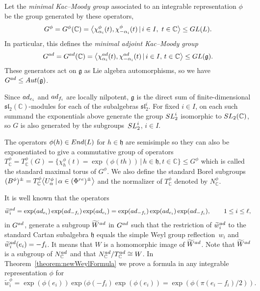 \documentclass[11pt]{article}
\numberwithin{equation}{section}
\numberwithin{equation}{section}
\def\C{{\mathbb C}}
\def\a{\alpha}
\def\wtil{\widetilde w}
\def\Wtil{\widetilde W}
\def\la{\langle}
\def\ra{\rangle}
\def\g{\mathfrak{g}}
\def\h{\mathfrak{h}}
\def\fh{\mathfrak{h}}
\def\fsl{\mathfrak{sl}}
\begin{document}
\begin{Definition} \label{definition:Kac--Moody_groups} Let the {\it minimal Kac--Moody group} associated to an integrable representation
$\phi$ be the group generated by these operators,
\[G^\phi = G^\phi(\C)=\big\la \chi^\phi_{{\a}_i}(t), \chi^\phi_{{-\a}_i}(t)\,|\, i\in I,\ t\in\C\big\ra\leq {\rm GL}(L).\]
In particular, this defines the {\it minimal adjoint Kac--Moody group}
\begin{gather}\label{equation:adjoint_Kac_Moody_group}
G^{\rm ad} = G^{\rm ad}(\C)=\big\la \chi^{\rm ad}_{{\a}_i}(t), \chi^{\rm ad}_{{-\a}_i}(t)\,|\, i\in I,\, t\in\C\big\ra\leq {\rm GL}(\g).
\end{gather}
These generators act on $\g$ as Lie algebra automorphisms, so we have $G^{\rm ad}\leq {\rm Aut}(\g)$.
\end{Definition}

Since ${\rm ad}_{e_i}$ and ${\rm ad}_{f_i}$ are locally nilpotent, $\g$ is the direct sum of finite-dimensional $\fsl_2(\C)$-modules for each of the subalgebras $\fsl_2^i$. For fixed $i\in I$, on each such summand the exponentials above generate the group ${\rm SL}_2^i$ isomorphic to ${\rm SL}_2(\C)$, so $G$ is also generated by the subgroups~${\rm SL}_2^i$, $i\in I$.

The operators $\phi(h)\in {\rm End}(L)$ for $h\in\h$ are semisimple so they can also be exponentiated to give a commutative group of operators $T_\C^\phi = T_\C^\phi(G) = \big\{\chi^\phi_h(t) = \exp(\phi(th))\, |\, h\in\h, t\in\C\big\}\leq G^\phi$ which is called the standard maximal torus of $G^\phi$. We also define the standard Borel subgroups $(B^\phi)^\pm = T_\C^\phi\big\la U^\phi_\a \, |\, \a\in(\Phi^{\rm re})^\pm\big\ra$ and the normalizer of $T_\C^\phi$ denoted by $N_\C^\phi$.

It is well known that the operators
\begin{gather*} \wtil^{\rm ad}_i = \exp({\rm ad}_{e_i})\exp({\rm ad}_{-f_i})\exp({\rm ad}_{e_i}) = \exp({\rm ad}_{-f_i})\exp({\rm ad}_{e_i})\exp({\rm ad}_{-f_i}) ,\qquad 1\leq i\leq\ell,\end{gather*}
in $G^{\rm ad}$, generate a subgroup
$\Wtil^{\rm ad}$ in $G^{\rm ad}$ such that the restriction of $\wtil^{\rm ad}_i$ to the standard Cartan subalgebra $\fh$ equals the simple Weyl group reflection~$w_i$ and $\wtil^{\rm ad}_i(e_i) = -f_i$. It means that $W$ is a homomorphic image of $\Wtil^{\rm ad}$.
Note that $\Wtil^{\rm ad}$ is a subgroup of $N_\C^{\rm ad}$ and that $N_\C^{\rm ad}/T_\C^{\rm ad} \cong W$. In Theorem~\ref{theorem:newWeylFormula}
we prove a formula in any integrable representation $\phi$ for
\[\wtil^{\phi}_i = \exp(\phi(e_i)) \exp(\phi(-f_i) \exp(\phi(e_i)) = \exp(\phi(\pi(e_i - f_i)/2)).\]
\end{document}
